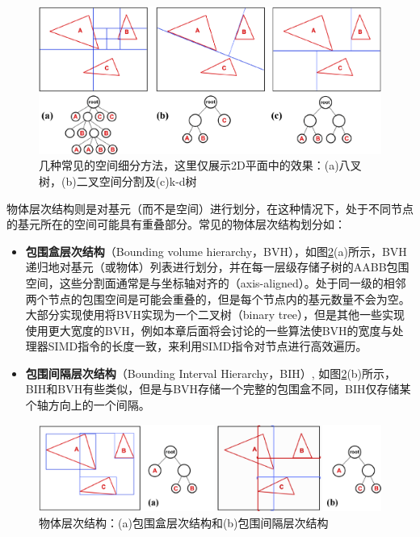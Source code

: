 \begin{figure}
	\includegraphics[width=1.\textwidth]{figures/pt/path-17-1}
	\caption{几种常见的空间细分方法，这里仅展示2D平面中的效果：(a)八叉树，(b)二叉空间分割及(c)k-d树}
	\label{f:pt-spatial-subdivisions}
\end{figure}

物体层次结构则是对基元（而不是空间）进行划分，在这种情况下，处于不同节点的基元所在的空间可能具有重叠部分。常见的物体层次结构划分如：

\begin{itemize}
	\item \textbf{包围盒层次结构}（Bounding volume hierarchy，BVH），如图\ref{f:pt-object-subdivisions}(a)所示，BVH递归地对基元（或物体）列表进行划分，并在每一层级存储子树的AABB包围空间，这些分割面通常是与坐标轴对齐的（axis-aligned）。处于同一级的相邻两个节点的包围空间是可能会重叠的，但是每个节点内的基元数量不会为空。大部分实现使用将BVH实现为一个二叉树（binary tree），但是其他一些实现使用更大宽度的BVH，例如本章后面将会讨论的一些算法使BVH的宽度与处理器SIMD指令的长度一致，来利用SIMD指令对节点进行高效遍历。
	\item \textbf{包围间隔层次结构}（Bounding Interval Hierarchy，BIH）, 如图\ref{f:pt-object-subdivisions}(b)所示，BIH和BVH有些类似，但是与BVH存储一个完整的包围盒不同，BIH仅存储某个轴方向上的一个间隔。
\end{itemize}

\begin{figure}
	\includegraphics[width=1.\textwidth]{figures/pt/path-17-2}
	\caption{物体层次结构：(a)包围盒层次结构和(b)包围间隔层次结构}
	\label{f:pt-object-subdivisions}
\end{figure}

